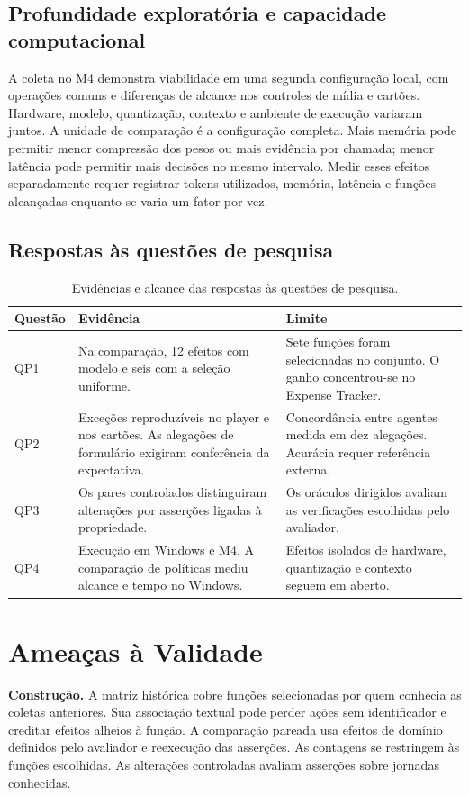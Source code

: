 \documentclass[12pt]{article}
\begin{document}
\subsection{Profundidade exploratória e capacidade computacional}\label{sec:depth}
A coleta no M4 demonstra viabilidade em uma segunda configuração local, com operações comuns e diferenças de alcance nos controles de mídia e cartões. Hardware, modelo, quantização, contexto e ambiente de execução variaram juntos. A unidade de comparação é a configuração completa. Mais memória pode permitir menor compressão dos pesos ou mais evidência por chamada; menor latência pode permitir mais decisões no mesmo intervalo. Medir esses efeitos separadamente requer registrar tokens utilizados, memória, latência e funções alcançadas enquanto se varia um fator por vez.

\subsection{Respostas às questões de pesquisa}
\begin{table}[ht]
\centering\small
\caption{Evidências e alcance das respostas às questões de pesquisa.}
\begin{tabular}{l>{\raggedright\arraybackslash}p{5.8cm}>{\raggedright\arraybackslash}p{5.5cm}}
\toprule
Questão & Evidência & Limite \\
\midrule
QP1 & Na comparação, 12 efeitos com modelo e seis com a seleção uniforme. & Sete funções foram selecionadas no conjunto. O ganho concentrou-se no Expense Tracker. \\
QP2 & Exceções reproduzíveis no player e nos cartões. As alegações de formulário exigiram conferência da expectativa. & Concordância entre agentes medida em dez alegações. Acurácia requer referência externa. \\
QP3 & Os pares controlados distinguiram alterações por asserções ligadas à propriedade. & Os oráculos dirigidos avaliam as verificações escolhidas pelo avaliador. \\
QP4 & Execução em Windows e M4. A comparação de políticas mediu alcance e tempo no Windows. & Efeitos isolados de hardware, quantização e contexto seguem em aberto. \\
\bottomrule
\end{tabular}
\end{table}


\section{Ameaças à Validade}\label{sec:threats}
\textbf{Construção.} A matriz histórica cobre funções selecionadas por quem conhecia as coletas anteriores. Sua associação textual pode perder ações sem identificador e creditar efeitos alheios à função. A comparação pareada usa efeitos de domínio definidos pelo avaliador e reexecução das asserções. As contagens se restringem às funções escolhidas. As alterações controladas avaliam asserções sobre jornadas conhecidas.
\end{document}
